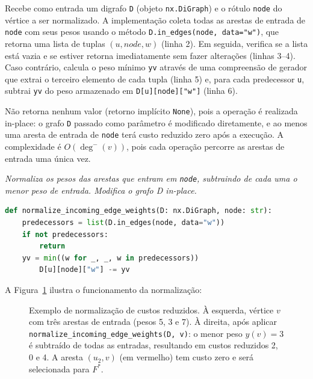Recebe como entrada um digrafo \texttt{D} (objeto \texttt{nx.DiGraph}) e o rótulo \texttt{node} do vértice a ser normalizado. A implementação coleta todas as arestas de entrada de \texttt{node} com seus pesos usando o método \texttt{D.in\_edges(node, data="w")}, que retorna uma lista de tuplas \((u, node, w)\) (linha 2). Em seguida, verifica se a lista está vazia e se estiver retorna imediatamente sem fazer alterações (linhas 3--4). Caso contrário, calcula o peso mínimo \texttt{yv} através de uma compreensão de gerador que extrai o terceiro elemento de cada tupla (linha 5) e, para cada predecessor \texttt{u}, subtrai \texttt{yv} do peso armazenado em \texttt{D[u][node]["w"]} (linha 6).

Não retorna nenhum valor (retorno implícito \texttt{None}), pois a operação é realizada in-place: o grafo \texttt{D} passado como parâmetro é modificado diretamente, e ao menos uma aresta de entrada de \texttt{node} terá custo reduzido zero após a execução. A complexidade é \(O(\deg^-(v))\), pois cada operação percorre as arestas de entrada uma única vez.

\begin{tcolorbox}[
        enhanced, breakable,
        colframe=blue!60!black, colback=blue!2,
        colbacktitle=blue!15, coltitle=black,
        title={Normalização por vértice: custos reduzidos},
        boxed title style={sharp corners, boxrule=0.6pt},
        sharp corners, boxrule=0.6pt
    ]
    \emph{Normaliza os pesos das arestas que entram em \texttt{node}, subtraindo de cada uma o menor peso de entrada. Modifica o grafo D in-place.}
    \tcblower
    \begin{lstlisting}[language=Python]
def normalize_incoming_edge_weights(D: nx.DiGraph, node: str):    
    predecessors = list(D.in_edges(node, data="w"))
    if not predecessors:
        return
    yv = min((w for _, _, w in predecessors))
        D[u][node]["w"] -= yv   
\end{lstlisting}
\end{tcolorbox}

A Figura~\ref{fig:normalize-example} ilustra o funcionamento da normalização:

\begin{figure}[H]
    \centering
    
    \caption{Exemplo de normalização de custos reduzidos. À esquerda, vértice \(v\) com três arestas de entrada (pesos 5, 3 e 7). À direita, após aplicar \texttt{normalize\_incoming\_edge\_weights(D, v)}: o menor peso \(y(v)=3\) é subtraído de todas as entradas, resultando em custos reduzidos 2, 0 e 4. A aresta \((u_2,v)\) (em vermelho) tem custo zero e será selecionada para \(F^*\).}
    \label{fig:normalize-example}
\end{figure}

